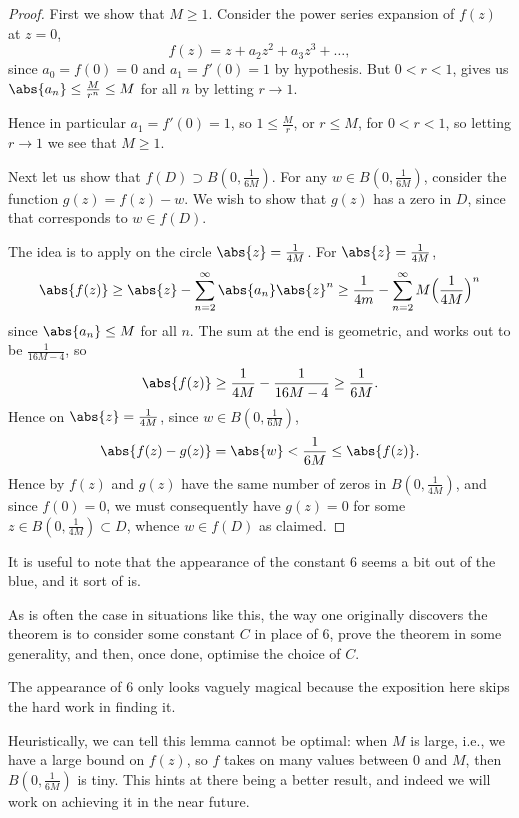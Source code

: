 \begin{proof}
	First we show that $M \geq 1$.
	Consider the power series expansion of $f(z)$ at $z = 0$,
	\[
		f(z) = z + a_2 z^2 + a_3 z^3 + \dots,
	\]
	since $a_0 = f(0) = 0$ and $a_1 = f'(0) = 1$ by hypothesis.
	But $0 < r < 1$,  gives us $\abs{a_n} \leq \frac{M}{r^n} \leq M$ for all $n$ by letting $r \to 1$.

	Hence in particular $a_1 = f'(0) = 1$, so $1 \leq \frac{M}{r}$, or $r \leq M$, for $0 < r < 1$, so letting $r \to 1$ we see that $M \geq 1$.

	Next let us show that $f(D) \supset B(0, \frac{1}{6 M})$.
	For any $w \in B(0, \frac{1}{6 M})$, consider the function $g(z) = f(z) - w$.
	We wish to show that $g(z)$ has a zero in $D$, since that corresponds to $w \in f(D)$.

	The idea is to apply  on the circle $\abs{z} = \frac{1}{4 M}$.
	For $\abs{z} = \frac{1}{4 M}$,
	\[
		\abs{f(z)} \geq \abs{z} - \sum_{n = 2}^\infty \abs{a_n} \abs{z}^n \geq \frac{1}{4 m} - \sum_{n = 2}^\infty M \Bigl( \frac{1}{4 M} \Bigr)^n
	\]
	since $\abs{a_n} \leq M$ for all $n$.
	The sum at the end is geometric, and works out to be $\frac{1}{16M - 4}$, so
	\[
		\abs{f(z)} \geq \frac{1}{4 M} - \frac{1}{16 M - 4} \geq \frac{1}{6 M}.
	\]
	Hence on $\abs{z} = \frac{1}{4 M}$, since $w \in B(0, \frac{1}{6 M})$,
	\[
		\abs{f(z) - g(z)} = \abs{w} < \frac{1}{6 M} \leq \abs{f(z)}.
	\]
	Hence by  $f(z)$ and $g(z)$ have the same number of zeros in $B(0, \frac{1}{4 M})$, and since $f(0) = 0$, we must consequently have $g(z) = 0$ for some $z \in B(0, \frac{1}{4 M}) \subset D$, whence $w \in f(D)$ as claimed.
\end{proof}

\begin{remark}
	It is useful to note that the appearance of the constant $6$ seems a bit out of the blue, and it sort of is.

	As is often the case in situations like this, the way one originally discovers the theorem is to consider some constant $C$ in place of $6$, prove the theorem in some generality, and then, once done, optimise the choice of $C$.

	The appearance of $6$ only looks vaguely magical because the exposition here skips the hard work in finding it.
\end{remark}

Heuristically, we can tell this lemma cannot be optimal: when $M$ is large, i.e., we have a large bound on $f(z)$, so $f$ takes on many values between $0$ and $M$, then $B(0, \frac{1}{6 M})$ is tiny.
This hints at there being a better result, and indeed we will work on achieving it in the near future.

